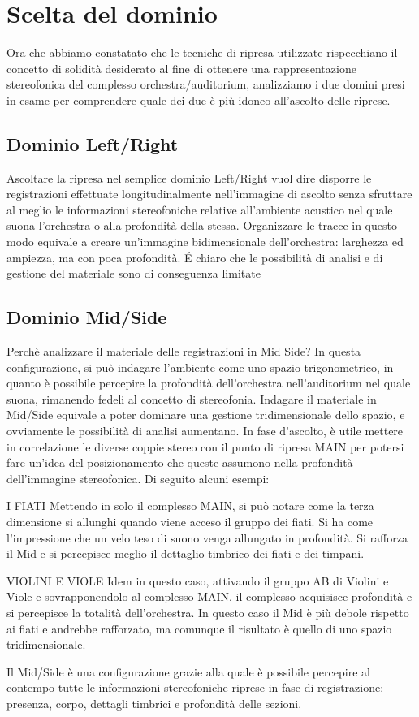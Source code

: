 \section*{Scelta del dominio}
Ora che abbiamo constatato che le tecniche di ripresa utilizzate rispecchiano il concetto di solidità desiderato al fine di ottenere una rappresentazione stereofonica del complesso orchestra/auditorium, analizziamo i due domini presi in esame per comprendere quale dei due è più idoneo all'ascolto delle riprese.

\subsection*{Dominio Left/Right}
Ascoltare la ripresa nel semplice dominio Left/Right vuol dire disporre le registrazioni effettuate longitudinalmente nell'immagine di ascolto senza sfruttare al meglio le informazioni stereofoniche relative all'ambiente acustico nel quale suona l'orchestra o alla profondità della stessa.
Organizzare le tracce in questo modo equivale a creare un'immagine bidimensionale dell'orchestra: larghezza ed ampiezza, ma con poca profondità.
É chiaro che le possibilità di analisi e di gestione del materiale sono di conseguenza limitate

\subsection*{Dominio Mid/Side}
Perchè analizzare il materiale delle registrazioni in Mid Side?
In questa configurazione, si può indagare l'ambiente come uno spazio trigonometrico, in quanto è possibile percepire la profondità dell'orchestra nell'auditorium nel quale suona, rimanendo fedeli al concetto di stereofonia.
Indagare il materiale in Mid/Side equivale a poter dominare una gestione tridimensionale dello spazio, e ovviamente le possibilità di analisi aumentano.
In fase d'ascolto, è utile mettere in correlazione le diverse coppie stereo con il punto di ripresa MAIN per potersi fare un'idea del posizionamento che  queste assumono nella profondità dell'immagine stereofonica.
Di seguito alcuni esempi:
\begin{compactitem} 
	\item [I FIATI] Mettendo in solo il complesso MAIN, si può notare come la terza dimensione si allunghi quando viene acceso il gruppo dei fiati. Si ha come l'impressione che un velo teso di suono venga allungato in profondità. Si rafforza il Mid e si percepisce meglio il dettaglio timbrico dei fiati e dei timpani.
	\item [VIOLINI E VIOLE] Idem in questo caso, attivando il gruppo AB  di Violini e Viole e sovrapponendolo al complesso MAIN, il complesso acquisisce profondità e si percepisce la totalità dell'orchestra. In questo caso il Mid è più debole rispetto ai fiati e andrebbe rafforzato, ma comunque il risultato è quello di uno spazio tridimensionale.
	\end{compactitem}
Il Mid/Side è una configurazione grazie alla quale è possibile percepire al contempo tutte le informazioni stereofoniche riprese in fase di registrazione: presenza, corpo, dettagli timbrici e profondità delle sezioni.

